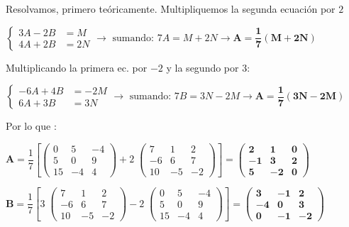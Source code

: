 \begin{proofw}\renewcommand{\qedsymbol}{$\diamond$}

Resolvamos, primero teóricamente. Multipliquemos la segunda ecuación por $2$

\noindent $\begin{cases} 3A-2B&=M\\4A+2B&=2N     \end{cases} \to \text{ sumando: } 7A=M+2N \to \boldsymbol{A=\dfrac 1 7 (M+2N) }$

\noindent Multiplicando la primera ec. por $-2$ y la segundo por $3$:

\noindent $\begin{cases} -6A+4B&=-2M\\6A+3B&=3N     \end{cases} \to \text{ sumando: } 7B=3N-2M \to \boldsymbol{A=\dfrac 1 7 (3N-2M) }$

Por lo que :

\noindent $\boldsymbol{A}=\dfrac 1 7 \left[ \left( \begin{matrix} 0&5&-4\\5&0&9\\15&-4&4  \end{matrix} \right)+2\;\left( \begin{matrix} 7&1&2\\-6&6&7\\10&-5&-2   \end{matrix} \right)  \right]=\boldsymbol{ \left( \begin{matrix} 2&1&0\\-1&3&2\\5&-2&0    \end{matrix} \right)}$

\noindent $\boldsymbol{B}= \dfrac 1 7 \left[ 3\; \left( \begin{matrix} 7&1&2\\-6&6&7\\10&-5&-2   \end{matrix} \right) -2\; \left( \begin{matrix} 0&5&-4\\5&0&9\\15&-4&4  \end{matrix} \right)   \right]= \boldsymbol{ \left( \begin{matrix} 3&-1&2\\-4&0&3\\0&-1&-2  \end{matrix} \right)}$
	
\end{proofw}


